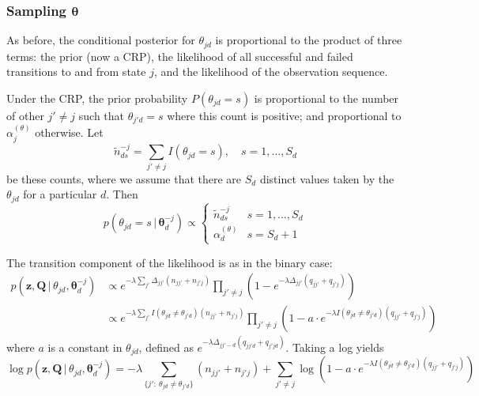 \documentclass[12pt,letterpaper]{report}
\newcommand{\given}{\, \vert \,}
\newcommand{\bQ}{\mathbf{Q}}
\newcommand{\bz}{\mathbf{z}}
\newcommand{\btheta}{\boldsymbol{\theta}}
\begin{document}
\subsubsection{Sampling $\btheta$}

As before, the conditional posterior for $\theta_{jd}$ 
is proportional to the product of three terms: the prior (now a CRP),
the likelihood of all successful and failed transitions to and from
state $j$, and the likelihood of the observation sequence.

Under the CRP, the prior probability $P(\theta_{jd} = s)$ is
proportional to the number of other $j' \neq j$ such that
$\theta_{j'd} = s$ where this count is positive; and proportional to
$\alpha_j^{(\theta)}$ otherwise.  Let 
\begin{equation}
\tilde{n}^{-j}_{ds} = \sum_{j' \neq j} I(\theta_{jd} = s), \quad s = 1,
\dots, S_d
\end{equation}
be these counts, where we assume that there are $S_d$ distinct values
taken by the $\theta_{jd}$ for a particular $d$.  Then
\begin{equation}
  p(\theta_{jd} = s \given \btheta_{d}^{-j}) \propto
\begin{cases}
\tilde{n}^{-j}_{ds} & s = 1, \dots, S_d \\
\alpha_{d}^{(\theta)} & s = S_d + 1
\end{cases}
\end{equation}

The transition component of the likelihood is as in the binary case:
\begin{align}
  p(\bz, \bQ \given \theta_{jd}, \btheta_{d}^{-j}) & \propto
  e^{-\lambda\sum_{j'} \Delta_{jj'} (n_{jj'} + n_{j'j})} \prod_{j'
    \neq j} (1 - e^{-\lambda\Delta_{jj'} (q_{jj'} + q_{j'j})})\\
  &\propto e^{-\lambda \sum_{j'} I(\theta_{jd} \neq \theta_{j'd})
    (n_{jj'} + n_{j'j})} \prod_{j'
    \neq j} (1 - a\cdot e^{-\lambda I(\theta_{jd} \neq \theta_{j'd}) (q_{jj'} + q_{j'j})})
\end{align}
where $a$ is a constant in $\theta_{jd}$, defined as $e^{-\lambda
  \Delta_{jj'-d} (q_{jj'd} + q_{j'jd})}$.  Taking a log yields
\begin{equation}
  \log p(\bz, \bQ \given \theta_{jd}, \btheta_{d}^{-j}) =
  -\lambda \sum_{\{j':\ \theta_{jd} \neq \theta_{j'd}\}} (n_{jj'} +
  n_{j'j}) + \sum_{j'
    \neq j} \log(1 - a\cdot e^{-\lambda I(\theta_{jd} \neq \theta_{j'd}) (q_{jj'} + q_{j'j})})
\end{equation}
\end{document}
